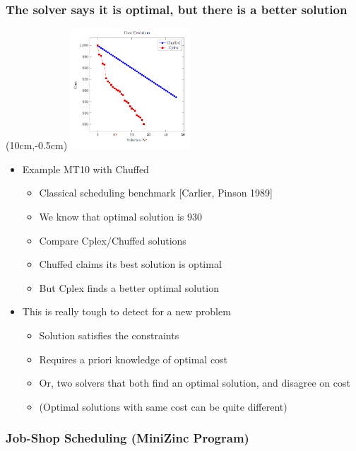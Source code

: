 \begin{frame}
\frametitle{The solver says it is optimal, but there is a better solution}
\begin{textblock*}{4.5cm}(10cm,-0.5cm)
\includegraphics[width=4.5cm]{images/mt10evolution.PNG}
\end{textblock*}
\begin{itemize}
\item Example MT10 with Chuffed
\begin{itemize}
 \item Classical scheduling benchmark [Carlier, Pinson 1989]
\item We know that optimal solution is 930
  \item Compare Cplex/Chuffed solutions
  \item Chuffed claims its best solution is optimal
  \item But Cplex finds a better optimal solution
  \end{itemize}
\item This is really tough to detect for a new problem
\begin{itemize}
\item Solution satisfies the constraints
\item Requires a priori knowledge of optimal cost
\item Or, two solvers that both find an optimal solution, and disagree on cost
\item (Optimal solutions with same cost can be quite different)
\end{itemize}
\end{itemize}
\end{frame}

\begin{frame}[fragile,label=mt10model]
\frametitle{Job-Shop Scheduling (MiniZinc Program)}

\end{frame}

